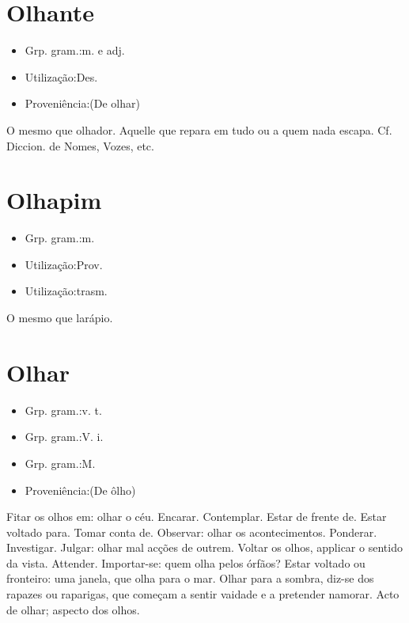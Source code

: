 \section{Olhante}
\begin{itemize}
\item {Grp. gram.:m.  e  adj.}
\end{itemize}
\begin{itemize}
\item {Utilização:Des.}
\end{itemize}
\begin{itemize}
\item {Proveniência:(De \textunderscore olhar\textunderscore )}
\end{itemize}
O mesmo que \textunderscore olhador\textunderscore .
Aquelle que repara em tudo ou a quem nada escapa. Cf. \textunderscore Diccion. de Nomes, Vozes\textunderscore , etc.
\section{Olhapim}
\begin{itemize}
\item {Grp. gram.:m.}
\end{itemize}
\begin{itemize}
\item {Utilização:Prov.}
\end{itemize}
\begin{itemize}
\item {Utilização:trasm.}
\end{itemize}
O mesmo que \textunderscore larápio\textunderscore .
\section{Olhar}
\begin{itemize}
\item {Grp. gram.:v. t.}
\end{itemize}
\begin{itemize}
\item {Grp. gram.:V. i.}
\end{itemize}
\begin{itemize}
\item {Grp. gram.:M.}
\end{itemize}
\begin{itemize}
\item {Proveniência:(De \textunderscore ôlho\textunderscore )}
\end{itemize}
Fitar os olhos em: \textunderscore olhar o céu\textunderscore .
Encarar.
Contemplar.
Estar de frente de.
Estar voltado para.
Tomar conta de.
Observar: \textunderscore olhar os acontecimentos\textunderscore .
Ponderar.
Investigar.
Julgar: \textunderscore olhar mal acções de outrem\textunderscore .
Voltar os olhos, applicar o sentido da vista.
Attender.
Importar-se: \textunderscore quem olha pelos órfãos\textunderscore ?
Estar voltado ou fronteiro: \textunderscore uma janela, que olha para o mar\textunderscore .
\textunderscore Olhar para a sombra\textunderscore , diz-se dos rapazes ou raparigas, que começam a sentir vaidade e a pretender namorar.
Acto de olhar; aspecto dos olhos.
